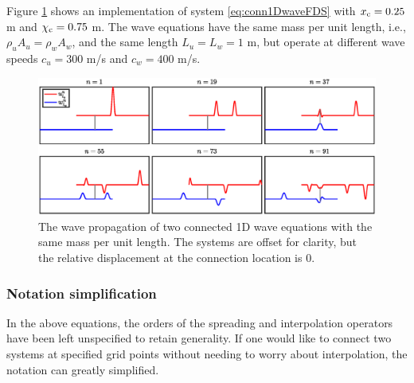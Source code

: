 Figure \ref{fig:connectedWaveEqs} shows an implementation of system \eqref{eq:conn1DwaveFDS} with $x_{\text{c}} = 0.25$ m and $\chi_{\text{c}} = 0.75$ m. The wave equations have the same mass per unit length, i.e., $\rho_uA_u = \rho_wA_w$, and the same length $L_u=L_w = 1$ m, but operate at different wave speeds $c_u=300$ m/s and $c_w=400$ m/s.

\begin{figure}[h]
    \includegraphics[width=\textwidth]{figures/interactions/connectedWaveEqs.eps}
    \caption{The wave propagation of two connected 1D wave equations with the same mass per unit length. The systems are offset for clarity, but the relative displacement at the connection location is 0. \label{fig:connectedWaveEqs}}
\end{figure}

\subsubsection{Notation simplification}
In the above equations, the orders of the spreading and interpolation operators have been left unspecified to retain generality. If one would like to connect two systems at specified grid points without needing to worry about interpolation, the notation can greatly simplified.%

